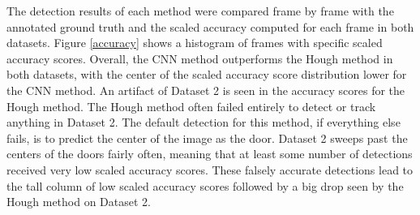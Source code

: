 \documentclass[12pt]{article}
\begin{document}
The detection results of each method were compared frame by frame with the annotated ground truth and the scaled accuracy computed for each frame in both datasets. Figure \ref{accuracy} shows a histogram of frames with specific scaled accuracy scores. Overall, the CNN method outperforms the Hough method in both datasets, with the center of the scaled accuracy score distribution lower for the CNN method. An artifact of Dataset 2 is seen in the accuracy scores for the Hough method. The Hough method often failed entirely to detect or track anything in Dataset 2. The default detection for this method, if everything else fails, is to predict the center of the image as the door. Dataset 2 sweeps past the centers of the doors fairly often, meaning that at least some number of detections received very low scaled accuracy scores. These falsely accurate detections lead to the tall column of low scaled accuracy scores followed by a big drop seen by the Hough method on Dataset 2.
\end{document}
